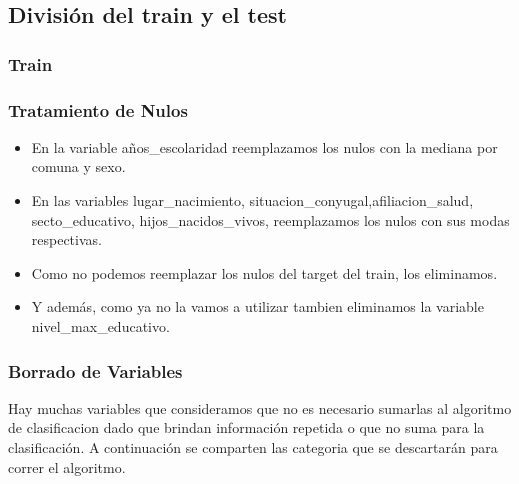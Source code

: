\documentclass[a4paper]{article}
\begin{document}
    \subsection{División del train y el test}

        \subsubsection{Train}

        \subsubsection*{Tratamiento de Nulos}

            \begin{itemize}
                \item En la variable años\_escolaridad reemplazamos los nulos con la mediana por comuna y sexo.
                \item En las variables lugar\_nacimiento, situacion\_conyugal,afiliacion\_salud, secto\_educativo, hijos\_nacidos\_vivos, reemplazamos los nulos con sus modas respectivas.
                \item Como no podemos reemplazar los nulos del target del train, los eliminamos.
                \item Y además, como ya no la vamos a utilizar tambien eliminamos la variable nivel\_max\_educativo.
            \end{itemize}
            
        \subsubsection*{Borrado de Variables}
            
            Hay muchas variables que consideramos que no es necesario sumarlas al algoritmo de clasificacion dado que brindan información repetida o que no suma para la clasificación. A continuación se comparten las categoria que se descartarán para correr el algoritmo.
            
\end{document}
